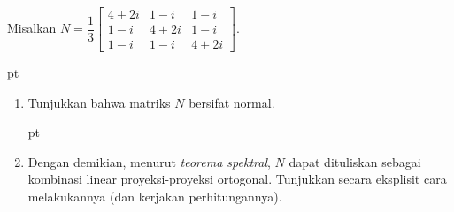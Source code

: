 \begin{exer} Misalkan $N = \dfrac13\begin{bmatrix}
                                4+2i & 1-i  & 1-i  \\
                                1-i  & 4+2i & 1-i  \\
                                1-i  & 1-i  & 4+2i \end{bmatrix}$.

 pt
 \begin{enumerate}
  \item Tunjukkan bahwa matriks $N$ bersifat normal.

 pt

  \item Dengan demikian, menurut \emph{teorema spektral}, $N$
dapat dituliskan sebagai kombinasi linear proyeksi-proyeksi ortogonal.
Tunjukkan secara eksplisit cara melakukannya (dan kerjakan perhitungannya).
 \end{enumerate}
\end{exer}

















\endinput
